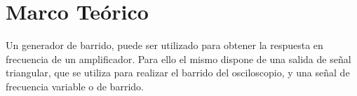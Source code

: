   \section{Marco Teórico}
    
Un generador de barrido, puede ser utilizado para obtener la respuesta en frecuencia 
de un amplificador. Para ello el mismo dispone de una salida de señal triangular, que 
se utiliza para realizar el barrido del osciloscopio, y una señal de frecuencia variable 
o de barrido.

